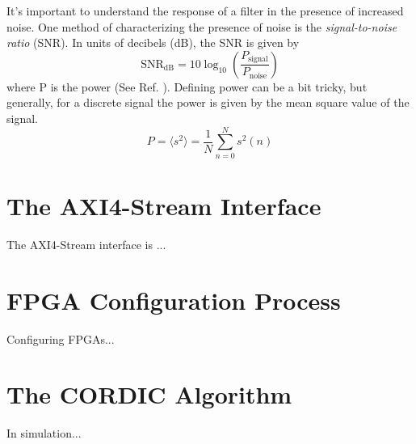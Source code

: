 \documentclass[reprint,amsmath,amssymb]{revtex4-2}
\begin{document}
It's important to understand the response of a filter in the presence of increased noise. One method of characterizing the presence of noise is the \textit{signal-to-noise ratio} (SNR). In units of decibels (dB), the SNR is given by
\begin{equation}
\text{SNR}_{\text{dB}} = 10 \log_{10}\left( \frac{P_{\text{signal}}}{P_{\text{noise}}} \right)
\end{equation}
where P is the power (See Ref. \cite{Johnson:2006:SNR}). Defining power can be a bit tricky, but generally, for a discrete signal the power is given by the mean square value of the signal.
\begin{equation}
    P = \langle s^2 \rangle = \frac{1}{N} \sum_{n=0}^N s^2(n)
\end{equation}

\begin{acknowledgments}
    \blindtext
\end{acknowledgments}

\appendix

\section{The AXI4-Stream Interface}

The AXI4-Stream interface is ...

\blindtext

\section{FPGA Configuration Process}

Configuring FPGAs...

\blindtext

\section{The CORDIC Algorithm}

In simulation...

\blindtext

\nocite{*}
\end{document}
